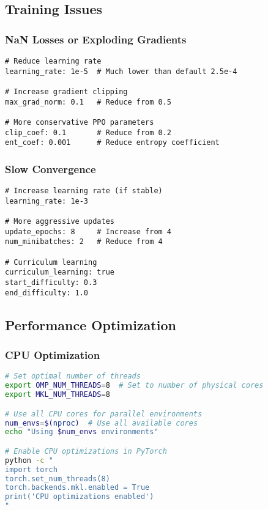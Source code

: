 \documentclass[12pt,a4paper]{article}
\begin{document}
\subsection{Training Issues}

\subsubsection{NaN Losses or Exploding Gradients}
\begin{lstlisting}[caption=Stable Training Configuration]
# Reduce learning rate
learning_rate: 1e-5  # Much lower than default 2.5e-4

# Increase gradient clipping
max_grad_norm: 0.1   # Reduce from 0.5

# More conservative PPO parameters
clip_coef: 0.1       # Reduce from 0.2
ent_coef: 0.001      # Reduce entropy coefficient
\end{lstlisting}

\subsubsection{Slow Convergence}
\begin{lstlisting}[caption=Faster Convergence Settings]
# Increase learning rate (if stable)
learning_rate: 1e-3

# More aggressive updates
update_epochs: 8     # Increase from 4
num_minibatches: 2   # Reduce from 4

# Curriculum learning
curriculum_learning: true
start_difficulty: 0.3
end_difficulty: 1.0
\end{lstlisting}

\subsection{Performance Optimization}

\subsubsection{CPU Optimization}
\begin{lstlisting}[language=bash, caption=CPU Performance Optimization]
# Set optimal number of threads
export OMP_NUM_THREADS=8  # Set to number of physical cores
export MKL_NUM_THREADS=8

# Use all CPU cores for parallel environments
num_envs=$(nproc)  # Use all available cores
echo "Using $num_envs environments"

# Enable CPU optimizations in PyTorch
python -c "
import torch
torch.set_num_threads(8)
torch.backends.mkl.enabled = True
print('CPU optimizations enabled')
"
\end{lstlisting}
\end{document}
